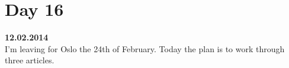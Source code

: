 \section{Day 16}
\textbf{12.02.2014} \\
I'm leaving for Oslo the 24th of February.
Today the plan is to work through three articles. 

